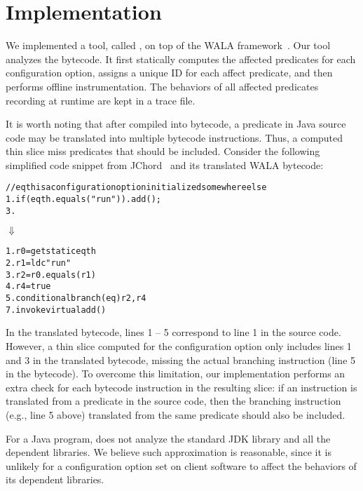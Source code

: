 \section{Implementation}
\label{sec:implementation}

We implemented a tool, called \ourtool, on top of the WALA
framework~\cite{wala}. Our tool analyzes the bytecode.
It first statically computes the affected predicates
for each configuration option, assigns a unique
ID for each affect predicate, and then performs offline instrumentation.
The behaviors of all affected predicates recording at runtime are 
kept in a trace file. 


It is worth noting that after compiled into bytecode,
a predicate in Java source code may be translated into multiple bytecode
instructions. Thus, a computed thin slice
miss predicates that should be included.
Consider the following simplified code snippet from JChord~\cite{jchord}
and its translated WALA bytecode:


\begin{CodeOut}
\begin{alltt}
   // eqth is a configuration option initialized somewhere else
1. if (eqth.equals("run")) .   add();
3. \ttrcb
\end{alltt}
\end{CodeOut}
\vspace{-2mm}
\hspace{20mm}$\Downarrow$ 
\begin{CodeOut}
\begin{alltt}
1. r0 = getstatic eqth
2. r1 = ldc "run"
3. r2 = r0.equals(r1)
4. r4 = true
5. conditional branch(eq) r2, r4
7. invokevirtual add() 
\end{alltt}
\end{CodeOut}

In the translated bytecode, lines 1 -- 5 correspond to line 1 in the
source code. However, a thin slice computed
for the configuration option  only includes lines 1 and 3
in the translated bytecode, missing the actual branching
instruction (line 5 in the bytecode).
To overcome this limitation, our implementation performs an extra check
for each bytecode instruction in the resulting slice:
if an instruction 
is translated from a predicate in the source code, then the
branching instruction (e.g., line 5 above) translated
from the same predicate should also be included.


For a Java program, \ourtool does not analyze the standard JDK
library and all the dependent libraries. We believe such approximation
is reasonable, since it is
unlikely for a configuration option set on client software
to affect the behaviors of its dependent libraries.

